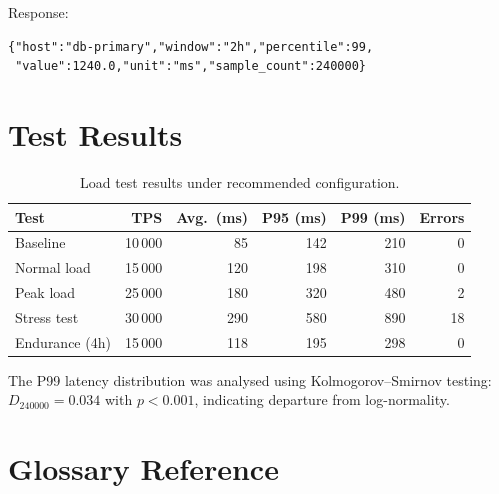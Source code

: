 \documentclass[
    language=english,
    doctype=technical-report,
    institution=none,
    titlestyle=book,
    oneside,
    loadGlossaries,
]{../../omnilatex}
\begin{document}
Response:
\begin{verbatim}
{"host":"db-primary","window":"2h","percentile":99,
 "value":1240.0,"unit":"ms","sample_count":240000}
\end{verbatim}

\chapter{Test Results}
\label{app:test-results}

\begin{table}[htbp]
    \centering
    \caption{Load test results under recommended configuration.}
    \label{tab:load-tests}
    \begin{tabular}{@{}lrrrrr@{}}
        \toprule
        Test & TPS & Avg.\ (ms) & P95 (ms) & P99 (ms) & Errors \\
        \midrule
        Baseline        & 10\,000 & 85  & 142 & 210 & 0 \\
        Normal load     & 15\,000 & 120 & 198 & 310 & 0 \\
        Peak load       & 25\,000 & 180 & 320 & 480 & 2 \\
        Stress test     & 30\,000 & 290 & 580 & 890 & 18 \\
        Endurance (4h)  & 15\,000 & 118 & 195 & 298 & 0 \\
        \bottomrule
    \end{tabular}
\end{table}

The P99 latency distribution was analysed using Kolmogorov--Smirnov
testing: $D_{240000} = 0.034$ with $p < 0.001$, indicating departure
from log-normality.

\chapter{Glossary Reference}
\label{app:glossary}
\end{document}
